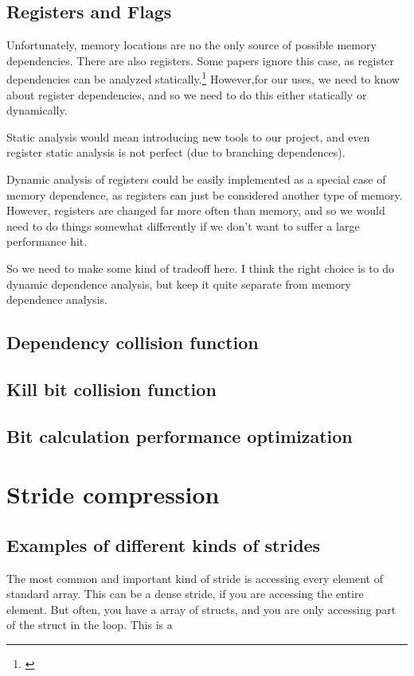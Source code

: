 \documentclass[12pt,twoside]{reedthesis}
\begin{document}
		
		\subsection{Registers and Flags}
		Unfortunately, memory locations are no the only source of possible memory dependencies. There are also registers. Some papers ignore this case, as register dependencies can be analyzed statically.\footnote{\cite{Chen:2004}} However,for our uses, we need to know about register dependencies, and so we need to do this either statically or dynamically. 
		
		Static analysis would mean introducing new tools to our project, and even register static analysis is not perfect (due to branching dependences).
		
		Dynamic analysis of registers could be easily implemented as a special case of memory dependence, as registers can just be considered another type of memory. However, registers are changed far more often than memory, and so we would need to do things somewhat differently if we don't want to suffer a large performance hit. 
		
		So we need to make some kind of tradeoff here. I think the right choice is to do dynamic dependence analysis, but keep it quite separate from memory dependence analysis. 
		
		\subsection{Dependency collision function}
		
		\subsection{Kill bit collision function}
		
		\subsection{Bit calculation performance optimization}
		
		
		
	\section{Stride compression}
		
		\subsection{Examples of different kinds of strides}
		The most common and important kind of stride is accessing every element of standard array. This can be a dense stride, if you are accessing the entire element. But often, you have a array of structs, and you are only accessing part of the struct in the loop. This is a $ $
		
\end{document}
